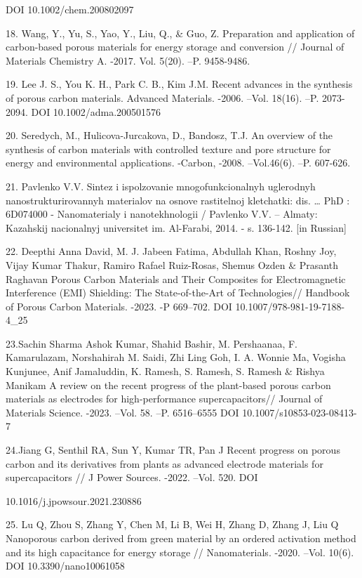 \begin{noparindent}
  DOI 10.1002/chem.200802097

18. Wang, Y., Yu, S., Yao, Y., Liu, Q., \& Guo, Z. Preparation and
  application of carbon-based porous materials for energy storage and
  conversion // Journal of Materials Chemistry A. -2017. Vol. 5(20).
  --P. 9458-9486.

19. Lee J. S., You K. H., Park C. B., Kim J.M. Recent advances in the
  synthesis of porous carbon materials. Advanced Materials. -2006.
  --Vol. 18(16). --P. 2073-2094. DOI 10.1002/adma.200501576

20. Seredych, M., Hulicova-Jurcakova, D., Bandosz, T.J. An overview of the
  synthesis of carbon materials with controlled texture and pore
  structure for energy and environmental applications. -Carbon, -2008.
  --Vol.46(6). --P. 607-626.

21. Pavlenko V.V. Sintez i ispol\textquotesingle zovanie
  mnogofunkcional\textquotesingle nyh uglerodnyh nanostrukturirovannyh
  materialov na osnove rastitel\textquotesingle noj kletchatki: dis.
  \ldots{} PhD : 6D074000 - Nanomaterialy i nanotekhnologii / Pavlenko
  V.V. -- Almaty: Kazahskij nacional\textquotesingle nyj universitet im.
  Al\textquotesingle-Farabi, 2014. - s. 136-142. {[}in Russian{]}

22. Deepthi Anna David, M. J. Jabeen Fatima, Abdullah Khan, Roshny Joy,
Vijay Kumar Thakur, Ramiro Rafael Ruiz-Rosas, Shemus Ozden \& Prasanth
Raghavan Porous Carbon Materials and Their Composites for
Electromagnetic Interference (EMI) Shielding: The State-of-the-Art of
Technologies// Handbook of Porous Carbon Materials. -2023. -P 669--702.
DOI 10.1007/978-981-19-7188-4\_25

23.Sachin Sharma Ashok Kumar, Shahid Bashir, M. Pershaanaa, F.
Kamarulazam, Norshahirah M. Saidi, Zhi Ling Goh, I. A. Wonnie Ma,
Vogisha Kunjunee, Anif Jamaluddin, K. Ramesh, S. Ramesh, S. Ramesh \&
Rishya Manikam A review on the recent progress of the plant-based porous
carbon materials as electrodes for high-performance supercapacitors//
Journal of Materials Science. -2023. --Vol. 58. --P. 6516--6555 DOI
10.1007/s10853-023-08413-7

24.Jiang G, Senthil RA, Sun Y, Kumar TR, Pan J Recent progress on porous
carbon and its derivatives from plants as advanced electrode materials
for supercapacitors // J Power Sources. -2022. --Vol. 520. DOI

10.1016/j.jpowsour.2021.230886

25. Lu Q, Zhou S, Zhang Y, Chen M, Li B, Wei H, Zhang D, Zhang J, Liu Q
Nanoporous carbon derived from green material by an ordered activation
method and its high capacitance for energy storage // Nanomaterials.
-2020. --Vol. 10(6). DOI 10.3390/nano10061058


\end{noparindent}
